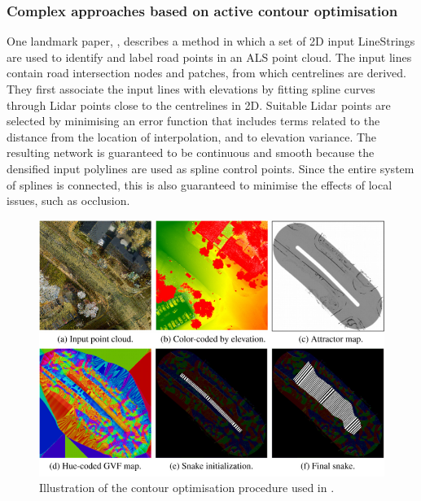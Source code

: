 \subsubsection{Complex approaches based on active contour optimisation}

One landmark paper, \cite{boyko_funkhauser_2011}, describes a method in which a set of 2D input LineStrings are used to identify and label road points in an ALS point cloud. The input lines contain road intersection nodes and patches, from which centrelines are derived. They first associate the input lines with elevations by fitting spline curves through Lidar points close to the centrelines in 2D. Suitable Lidar points are selected by minimising an error function that includes terms related to the distance from the location of interpolation, and to elevation variance. The resulting network is guaranteed to be continuous and smooth because the densified input polylines are used as spline control points. Since the entire system of splines is connected, this is also guaranteed to minimise the effects of local issues, such as occlusion.

\begin{figure}
    \centering
    \includegraphics[width=0.85\linewidth]{final_report/figs/boyko_funkahuser_2011_01.png} 
    \caption{Illustration of the contour optimisation procedure used in \cite{boyko_funkhauser_2011}.}
    \label{fig:boykofunkhauser2011}
\end{figure}

